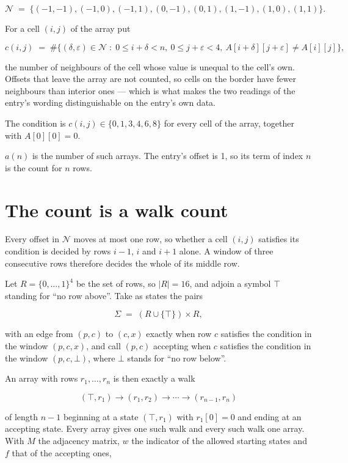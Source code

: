 \documentclass[11pt]{article}
\theoremstyle{definition}
\begin{document}
\[\mathcal{N} \;=\; \{(-1,-1), (-1,0), (-1,1), (0,-1), (0,1), (1,-1), (1,0), (1,1)\}.\]

For a cell $(i,j)$ of the array put

\[c(i,j) \;=\; \#\bigl\{(\delta,\varepsilon)\in\mathcal{N} \;:\; 0\le i+\delta<n,\ 0\le j+\varepsilon<4,\ A[i+\delta][j+\varepsilon] \neq A[i][j]\bigr\},\]

the number of neighbours of the cell whose value is unequal to the cell's own. Offsets that leave the array are not counted, so cells on the border have fewer neighbours than interior ones --- which is what makes the two readings of the entry's wording distinguishable on the entry's own data.

The condition is $c(i,j) \in \{0, 1, 3, 4, 6, 8\}$ for every cell of the array, together with $A[0][0]=0$.

$a(n)$ is the number of such arrays. The entry's offset is 1, so its term of index $n$ is the count for $n$ rows.

\section{The count is a walk count}

Every offset in $\mathcal{N}$ moves at most one row, so whether a cell $(i,j)$ satisfies its condition is decided by rows $i-1$, $i$ and $i+1$ alone. A window of three consecutive rows therefore decides the whole of its middle row.

Let $R = \{0,\dots,1\}^{4}$ be the set of rows, so $|R| = 16$, and adjoin a symbol $\top$ standing for ``no row above''. Take as states the pairs

\[\Sigma \;=\; (R \cup \{\top\}) \times R,\]

with an edge from $(p,c)$ to $(c,x)$ exactly when row $c$ satisfies the condition in the window $(p,c,x)$, and call $(p,c)$ accepting when $c$ satisfies the condition in the window $(p,c,\bot)$, where $\bot$ stands for ``no row below''.

An array with rows $r_1,\dots,r_n$ is then exactly a walk

\[(\top,r_1) \to (r_1,r_2) \to \cdots \to (r_{n-1},r_n)\]

of length $n-1$ beginning at a state $(\top,r_1)$ with $r_1[0]=0$ and ending at an accepting state. Every array gives one such walk and every such walk one array. With $M$ the adjacency matrix, $w$ the indicator of the allowed starting states and $f$ that of the accepting ones,
\end{document}
